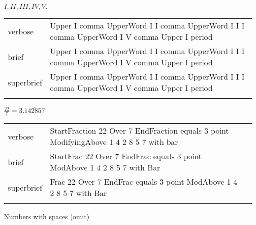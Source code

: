 \R
\E $I,II,III,IV,V.$
\begin{longtable}[c]{@{}ll@{}}
\toprule\addlinespace
verbose & Upper I comma UpperWord I I comma UpperWord I I I comma
UpperWord I V comma Upper I period
\\\addlinespace
brief & Upper I comma UpperWord I I comma UpperWord I I I comma
UpperWord I V comma Upper I period
\\\addlinespace
superbrief & Upper I comma UpperWord I I comma UpperWord I I I comma
UpperWord I V comma Upper I period
\\\addlinespace
\bottomrule
\end{longtable}


\R
\E $\frac{22}{7}=3.\overline{142857}$
\begin{longtable}[c]{@{}lll@{}}
\toprule\addlinespace
verbose & StartFraction 22 Over 7 EndFraction equals 3 point
ModifyingAbove 1 4 2 8 5 7 with bar &

\\\addlinespace
brief & StartFrac 22 Over 7 EndFrac equals 3 point ModAbove 1 4 2 8 5 7
with Bar &

\\\addlinespace
superbrief & Frac 22 Over 7 EndFrac equals 3 point ModAbove 1 4 2 8 5 7
with Bar &

\\\addlinespace
\bottomrule
\end{longtable}

\R
Numbers with spaces (omit)


